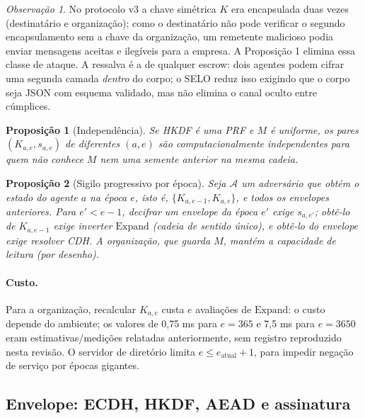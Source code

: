 \documentclass[11pt,a4paper]{article}
\theoremstyle{plain}
\newtheorem{proposicao}{Proposição}
\theoremstyle{definition}
\theoremstyle{remark}
\newtheorem*{observacao}{Observação}
\newcommand{\Exp}{\mathrm{Expand}}
\begin{document}
\begin{observacao}
No protocolo v3 a chave simétrica $K$ era encapsulada duas vezes (destinatário e organização); como o destinatário não pode verificar o segundo encapsulamento sem a chave da organização, um remetente malicioso podia enviar mensagens aceitas e ilegíveis para a empresa. A Proposição 1 elimina essa classe de ataque. A ressalva é a de qualquer escrow: dois agentes podem cifrar uma segunda camada \emph{dentro} do corpo; o SELO reduz isso exigindo que o corpo seja JSON com esquema validado, mas não elimina o canal oculto entre cúmplices.
\end{observacao}

\begin{proposicao}[Independência]
Se HKDF é uma PRF e $M$ é uniforme, os pares $(K_{a,e},s_{a,e})$ de diferentes $(a,e)$ são computacionalmente independentes para quem não conhece $M$ nem uma semente anterior na mesma cadeia.
\end{proposicao}

\begin{proposicao}[Sigilo progressivo por época]
Seja $\mathcal{A}$ um adversário que obtém o estado do agente $a$ na época $e$, isto é, $\{K_{a,e-1},K_{a,e}\}$, e todos os envelopes anteriores. Para $e'<e-1$, decifrar um envelope da época $e'$ exige $s_{a,e'}$; obtê-lo de $K_{a,e-1}$ exige inverter $\Exp$ (cadeia de sentido único), e obtê-lo do envelope exige resolver CDH. A organização, que guarda $M$, mantém a capacidade de leitura (por desenho).
\end{proposicao}

\paragraph{Custo.} Para a organização, recalcular $K_{a,e}$ custa $e$ avaliações de $\Exp$: o custo depende do ambiente; os valores de 0,75 ms para $e=365$ e 7,5 ms para $e=3650$ eram estimativas/medições relatadas anteriormente, sem registro reproduzido nesta revisão. O servidor de diretório limita $e\le e_{\text{atual}}+1$, para impedir negação de serviço por épocas gigantes.

\subsection{Envelope: ECDH, HKDF, AEAD e assinatura}
\end{document}
